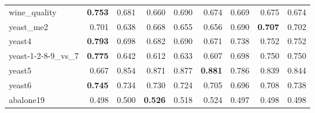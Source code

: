 \begin{table}[!htbp]
{\begin{tabular}{lrrrrrrrr}
			wine\_quality & \textbf{0.753} & 0.681 & 0.660 & 0.690 & 0.674 & 0.669 & 0.675 & 0.674 \\
			yeast\_me2 & 0.701 & 0.638 & 0.668 & 0.655 & 0.656 & 0.690 & \textbf{0.707} & 0.702 \\
			yeast4 & \textbf{0.793} & 0.698 & 0.682 & 0.690 & 0.671 & 0.738 & 0.752 & 0.752 \\
			yeast-1-2-8-9\_vs\_7 & \textbf{0.775} & 0.642 & 0.612 & 0.633 & 0.607 & 0.698 & 0.750 & 0.750 \\
			yeast5 & 0.667 & 0.854 & 0.871 & 0.877 & \textbf{0.881} & 0.786 & 0.839 & 0.844 \\
			yeast6 & \textbf{0.745} & 0.734 & 0.730 & 0.724 & 0.705 & 0.696 & 0.708 & 0.738 \\
			abalone19 & 0.498 & 0.500 & \textbf{0.526} & 0.518 & 0.524 & 0.497 & 0.498 & 0.498 \\
			\bottomrule
		\end{tabular}%
	}
	\label{tab:F1AllDatasets}%
\end{table}%

